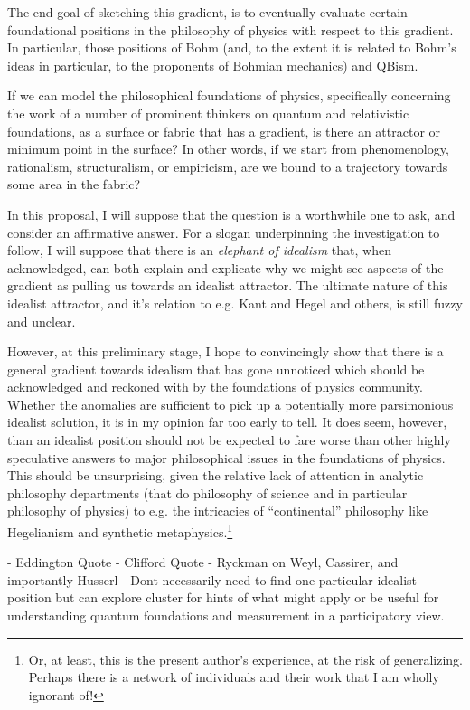 The end goal of sketching this gradient, is to eventually evaluate certain foundational positions in the philosophy of physics with respect to this gradient.  In particular, those positions of Bohm (and, to the extent it is related to Bohm's ideas in particular, to the proponents of Bohmian mechanics) and QBism.  


If we can model the philosophical foundations of physics, specifically concerning the work of a number of prominent thinkers on quantum and relativistic foundations, as a surface or fabric that has a gradient, is there an attractor or minimum point in the surface?  In other words, if we start from phenomenology, rationalism, structuralism, or empiricism, are we bound to a trajectory towards some area in the fabric?  

In this proposal, I will suppose that the question is a worthwhile one to ask, and consider an affirmative answer.  For a slogan underpinning the investigation to follow, I will suppose that there is an \emph{elephant of idealism} that, when acknowledged, can both explain and explicate why we might see aspects of the gradient as pulling us towards an idealist attractor.  The ultimate nature of this idealist attractor, and it's relation to e.g. Kant and Hegel and others, is still fuzzy and unclear.  

However, at this preliminary stage, I hope to convincingly show that there is a general gradient towards idealism that has gone unnoticed which should be acknowledged and reckoned with by the foundations of physics community.  Whether the anomalies are sufficient to pick up a potentially more parsimonious idealist solution, it is in my opinion far too early to tell.  It does seem, however, than an idealist position should not be expected to fare worse than other highly speculative answers to major philosophical issues in the foundations of physics.  This should be unsurprising, given the relative lack of attention in analytic philosophy departments (that do philosophy of science and in particular philosophy of physics) to e.g. the intricacies of ``continental'' philosophy like Hegelianism and synthetic metaphysics.\footnote{Or, at least, this is the present author's experience, at the risk of generalizing.  Perhaps there is a network of individuals and their work that I am wholly ignorant of!}


- Eddington Quote
- Clifford Quote
- Ryckman on Weyl, Cassirer, and importantly Husserl
- Dont necessarily need to find one particular idealist position but can explore cluster for hints of what might apply or be useful for understanding quantum foundations and measurement in a participatory view.

